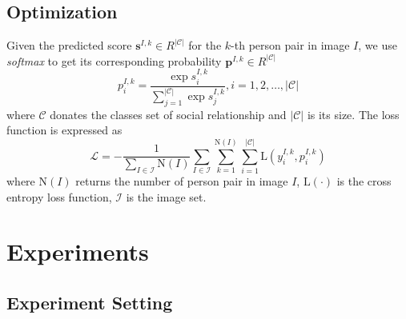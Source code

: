 \documentclass{article}
\begin{document}
\subsection{Optimization}

Given the predicted score $\mathbf{s}^{I,k} \in R^{|\mathcal{C}|}$ for the $k$-th person pair in image $I$, we use {\it softmax} to get its corresponding probability $\mathbf{p}^{I,k} \in R^{|\mathcal{C}|}$
\begin{equation}
  \label{eq:prob_eq}
  p_i^{I,k} = \frac{\exp{s_i^{I,k}}}{\sum_{j=1}^{|\mathcal{C}|}{\exp{s_j^{I,k}}}}, i=1,2,\dots,|\mathcal{C}|
\end{equation}
where $\mathcal{C}$ donates the classes set of social relationship and $|\mathcal{C}|$ is its size. The loss function is expressed as
\begin{equation}
  \label{eq:loss_eq}
  \mathcal{L} = - \frac{1}{\sum_{I \in \mathcal{I}}\text{N}(I)} \sum_{I \in \mathcal{I}} \sum_{k=1}^{\text{N}(I)} \sum_{i=1}^{|\mathcal{C}|} \text{L}(y_{i}^{I,k}, p_{i}^{I,k})
\end{equation}
where $\text{N}(I)$ returns the number of person pair in image $I$, $\text{L}(\cdot)$ is the cross entropy loss function, $\mathcal{I}$ is the image set.

\section{Experiments}

\subsection{Experiment Setting}
\end{document}
